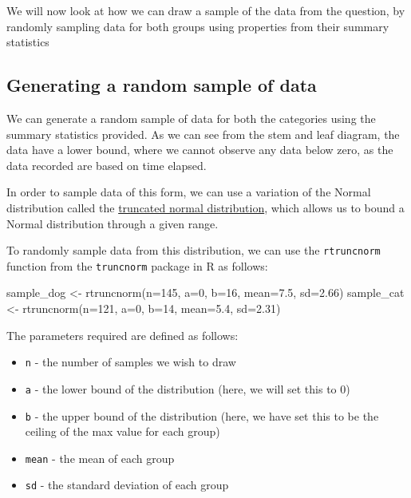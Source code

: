 \documentclass[
]{book}
\newenvironment{Shaded}{\begin{snugshade}}{\end{snugshade}}
\newcommand{\AttributeTok}[1]{\textcolor[rgb]{0.77,0.63,0.00}{#1}}
\newcommand{\DecValTok}[1]{\textcolor[rgb]{0.00,0.00,0.81}{#1}}
\newcommand{\FloatTok}[1]{\textcolor[rgb]{0.00,0.00,0.81}{#1}}
\newcommand{\FunctionTok}[1]{\textcolor[rgb]{0.00,0.00,0.00}{#1}}
\newcommand{\NormalTok}[1]{#1}
\newcommand{\OtherTok}[1]{\textcolor[rgb]{0.56,0.35,0.01}{#1}}
\providecommand{\tightlist}{%
  \setlength{\itemsep}{0pt}\setlength{\parskip}{0pt}}
\begin{document}
We will now look at how we can draw a sample of the data from the question, by randomly sampling data for both groups using properties from their summary statistics

\hypertarget{generating-a-random-sample-of-data}{%
\subsection{Generating a random sample of data}\label{generating-a-random-sample-of-data}}

We can generate a random sample of data for both the categories using the summary statistics provided. As we can see from the stem and leaf diagram, the data have a lower bound, where we cannot observe any data below zero, as the data recorded are based on time elapsed.

In order to sample data of this form, we can use a variation of the Normal distribution called the \href{https://en.wikipedia.org/wiki/Truncated_normal_distribution}{truncated normal distribution}, which allows us to bound a Normal distribution through a given range.

To randomly sample data from this distribution, we can use the \texttt{rtruncnorm} function from the \texttt{truncnorm} package in R as follows:

\begin{Shaded}
\begin{Highlighting}[]
\NormalTok{sample\_dog }\OtherTok{\textless{}{-}} \FunctionTok{rtruncnorm}\NormalTok{(}\AttributeTok{n=}\DecValTok{145}\NormalTok{, }\AttributeTok{a=}\DecValTok{0}\NormalTok{, }\AttributeTok{b=}\DecValTok{16}\NormalTok{, }\AttributeTok{mean=}\FloatTok{7.5}\NormalTok{, }\AttributeTok{sd=}\FloatTok{2.66}\NormalTok{)}
\NormalTok{sample\_cat }\OtherTok{\textless{}{-}} \FunctionTok{rtruncnorm}\NormalTok{(}\AttributeTok{n=}\DecValTok{121}\NormalTok{, }\AttributeTok{a=}\DecValTok{0}\NormalTok{, }\AttributeTok{b=}\DecValTok{14}\NormalTok{, }\AttributeTok{mean=}\FloatTok{5.4}\NormalTok{, }\AttributeTok{sd=}\FloatTok{2.31}\NormalTok{)}
\end{Highlighting}
\end{Shaded}

The parameters required are defined as follows:

\begin{itemize}
\tightlist
\item
  \texttt{n} - the number of samples we wish to draw
\item
  \texttt{a} - the lower bound of the distribution (here, we will set this to 0)
\item
  \texttt{b} - the upper bound of the distribution (here, we have set this to be the ceiling of the max value for each group)
\item
  \texttt{mean} - the mean of each group
\item
  \texttt{sd} - the standard deviation of each group
\end{itemize}
\end{document}

